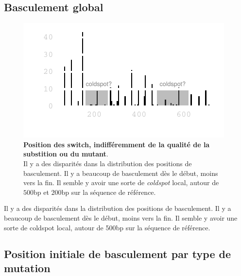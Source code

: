 \documentclass[a4paper]{tufte-handout}
\begin{document}
\subsection{Basculement global}
\label{sec:orgheadline9}
\begin{figure}
  \centering
  \includegraphics[width=\linewidth]{../switch_position_globale.pdf}
  \caption{\textbf{Position des switch, indifféremment de la qualité de la
      substition ou du mutant}. \\
    Il y a des disparités dans la distribution des positions de basculement. Il
    y a beaucoup de basculement dès le début, moins vers la fin. Il semble y
    avoir une sorte de \emph{coldspot} local, autour de $500$bp et $200$bp sur
    la séquence de référence. }
\end{figure}
Il y a des disparités dans la distribution des positions de basculement. Il y a
beaucoup de basculement dès le début, moins vers la fin. Il semble y avoir une
sorte de coldspot local, autour de 500bp sur la séquence de référence. 

\subsection{Position initiale de basculement par type de mutation}
\label{sec:orgheadline10}
\end{document}
